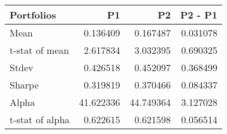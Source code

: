 \begin{tabular}{lrrr}
\toprule
Portfolios & P1 & P2 & P2 - P1 \\
\midrule
Mean & 0.136409 & 0.167487 & 0.031078 \\
t-stat of mean & 2.617834 & 3.032395 & 0.690325 \\
Stdev & 0.426518 & 0.452097 & 0.368499 \\
Sharpe & 0.319819 & 0.370466 & 0.084337 \\
Alpha & 41.622336 & 44.749364 & 3.127028 \\
t-stat of alpha & 0.622615 & 0.621598 & 0.056514 \\
\bottomrule
\end{tabular}
